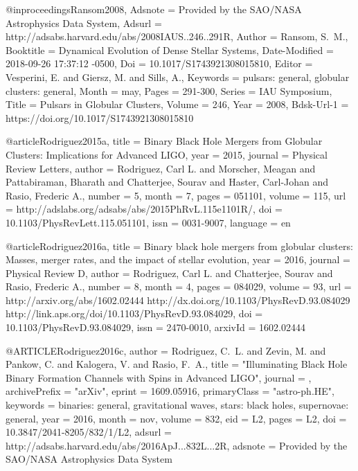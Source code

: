 \documentclass[twocolumn,tighten]{aastex63}
\begin{document}
{{{{{{{@inproceedings{Ransom2008,
	Adsnote = {Provided by the SAO/NASA Astrophysics Data System},
	Adsurl = {http://adsabs.harvard.edu/abs/2008IAUS..246..291R},
	Author = {{Ransom}, S.~M.},
	Booktitle = {Dynamical Evolution of Dense Stellar Systems},
	Date-Modified = {2018-09-26 17:37:12 -0500},
	Doi = {10.1017/S1743921308015810},
	Editor = {{Vesperini}, E. and {Giersz}, M. and {Sills}, A.},
	Keywords = {pulsars: general, globular clusters: general},
	Month = may,
	Pages = {291-300},
	Series = {IAU Symposium},
	Title = {{Pulsars in Globular Clusters}},
	Volume = 246,
	Year = 2008,
	Bdsk-Url-1 = {https://doi.org/10.1017/S1743921308015810}}

@article{Rodriguez2015a,
    title = {{Binary Black Hole Mergers from Globular Clusters: Implications for Advanced LIGO}},
    year = {2015},
    journal = {Physical Review Letters},
    author = {Rodriguez, Carl L. and Morscher, Meagan and Pattabiraman, Bharath and Chatterjee, Sourav and Haster, Carl-Johan and Rasio, Frederic A.},
    number = {5},
    month = {7},
    pages = {051101},
    volume = {115},
    url = {http://adslabs.org/adsabs/abs/2015PhRvL.115e1101R/},
    doi = {10.1103/PhysRevLett.115.051101},
    issn = {0031-9007},
    language = {en}
}

@article{Rodriguez2016a,
    title = {{Binary black hole mergers from globular clusters: Masses, merger rates, and the impact of stellar evolution}},
    year = {2016},
    journal = {Physical Review D},
    author = {Rodriguez, Carl L. and Chatterjee, Sourav and Rasio, Frederic A.},
    number = {8},
    month = {4},
    pages = {084029},
    volume = {93},
    url = {http://arxiv.org/abs/1602.02444 http://dx.doi.org/10.1103/PhysRevD.93.084029 http://link.aps.org/doi/10.1103/PhysRevD.93.084029},
    doi = {10.1103/PhysRevD.93.084029},
    issn = {2470-0010},
    arxivId = {1602.02444}
}

@ARTICLE{Rodriguez2016c,
   author = {{Rodriguez}, C.~L. and {Zevin}, M. and {Pankow}, C. and {Kalogera}, V. and 
	{Rasio}, F.~A.},
    title = "{Illuminating Black Hole Binary Formation Channels with Spins in Advanced LIGO}",
  journal = {\apjl},
archivePrefix = "arXiv",
   eprint = {1609.05916},
 primaryClass = "astro-ph.HE",
 keywords = {binaries: general, gravitational waves, stars: black holes, supernovae: general},
     year = 2016,
    month = nov,
   volume = 832,
      eid = {L2},
    pages = {L2},
      doi = {10.3847/2041-8205/832/1/L2},
   adsurl = {http://adsabs.harvard.edu/abs/2016ApJ...832L...2R},
  adsnote = {Provided by the SAO/NASA Astrophysics Data System}
}

}}}}}}}
\end{document}
